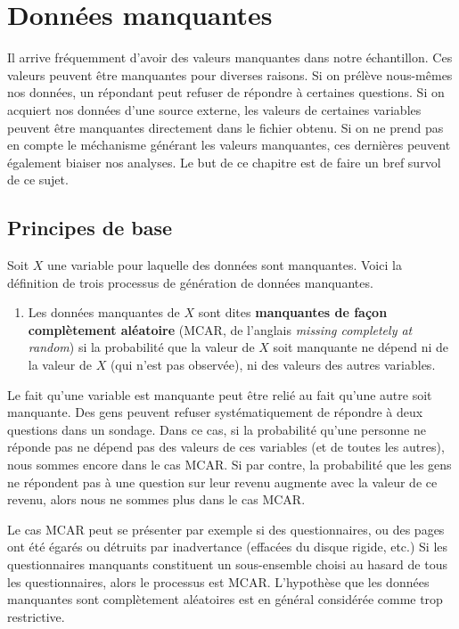 \documentclass[
  11pt,
  letterpaper,
]{scrbook}
\providecommand{\tightlist}{%
  \setlength{\itemsep}{0pt}\setlength{\parskip}{0pt}}\usepackage{longtable,booktabs,array}
\theoremstyle{definition}
\theoremstyle{remark}
\begin{document}

\hypertarget{donnees-manquantes}{%
\chapter{Données manquantes}\label{donnees-manquantes}}

Il arrive fréquemment d'avoir des valeurs manquantes dans notre
échantillon. Ces valeurs peuvent être manquantes pour diverses raisons.
Si on prélève nous-mêmes nos données, un répondant peut refuser de
répondre à certaines questions. Si on acquiert nos données d'une source
externe, les valeurs de certaines variables peuvent être manquantes
directement dans le fichier obtenu. Si on ne prend pas en compte le
méchanisme générant les valeurs manquantes, ces dernières peuvent
également biaiser nos analyses. Le but de ce chapitre est de faire un
bref survol de ce sujet.

\hypertarget{principes-de-base}{%
\section{Principes de base}\label{principes-de-base}}

Soit \(X\) une variable pour laquelle des données sont manquantes. Voici
la définition de trois processus de génération de données manquantes.

\begin{enumerate}
\def\labelenumi{\arabic{enumi})}
\tightlist
\item
  Les données manquantes de \(X\) sont dites \textbf{manquantes de façon
  complètement aléatoire} (MCAR, de l'anglais \emph{missing completely
  at random}) si la probabilité que la valeur de \(X\) soit manquante ne
  dépend ni de la valeur de \(X\) (qui n'est pas observée), ni des
  valeurs des autres variables.
\end{enumerate}

Le fait qu'une variable est manquante peut être relié au fait qu'une
autre soit manquante. Des gens peuvent refuser systématiquement de
répondre à deux questions dans un sondage. Dans ce cas, si la
probabilité qu'une personne ne réponde pas ne dépend pas des valeurs de
ces variables (et de toutes les autres), nous sommes encore dans le cas
MCAR. Si par contre, la probabilité que les gens ne répondent pas à une
question sur leur revenu augmente avec la valeur de ce revenu, alors
nous ne sommes plus dans le cas MCAR.

Le cas MCAR peut se présenter par exemple si des questionnaires, ou des
pages ont été égarés ou détruits par inadvertance (effacées du disque
rigide, etc.) Si les questionnaires manquants constituent un
sous-ensemble choisi au hasard de tous les questionnaires, alors le
processus est MCAR. L'hypothèse que les données manquantes sont
complètement aléatoires est en général considérée comme trop
restrictive.
\end{document}
